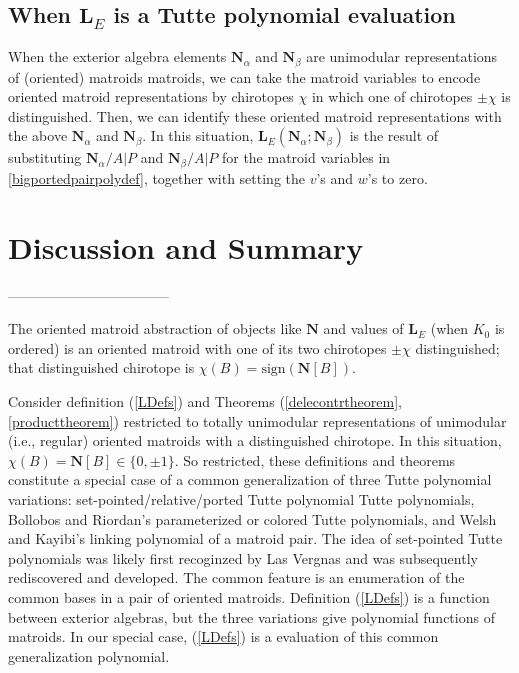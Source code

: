 \documentclass[Unicode]{cedram-alco}
\newcommand{\ext}[1]{\ensuremath{\mathbf{#1}}}
\begin{document}
\subsection{When $\ext{L}_E$ is a Tutte polynomial evaluation}
When the exterior algebra elements $\ext{N}_\alpha$ and $\ext{N}_\beta$ are
unimodular representations of (oriented) matroids matroids,  we can take the
matroid variables to encode oriented matroid representations by chirotopes $\chi$
in which one of chirotopes $\pm \chi$ is distinguished.  Then, we can identify
these oriented matroid representations with the above  $\ext{N}_\alpha$ and $\ext{N}_\beta$.
In this situation, $\ext{L}_E(\ext{N}_\alpha;\ext{N}_\beta)$ is the result
of substituting $\ext{N}_\alpha/A|P$ and $\ext{N}_\beta/A|P$ for the matroid
variables in \ref{bigportedpairpolydef}, together with setting the $v$'s and $w$'s to zero.

\section{Discussion and Summary}\label{discussion}



\newpage

-----------------------------------

The oriented matroid abstraction of objects like $\ext{N}$ and values of $\ext{L}_E$
(when $K_0$ is ordered) is an oriented matroid with one of its two chirotopes $\pm \chi$ distinguished; that
distinguished chirotope is $\chi(B) = \text{sign}(\ext{N}[B])$.

Consider definition (\ref{LDefs}) and Theorems (\ref{delecontrtheorem},\ref{producttheorem})
restricted to totally unimodular representations of unimodular (i.e., regular) oriented matroids
with a distinguished chirotope.  In this situation,  $\chi(B) = \ext{N}[B]\in \{0,\pm 1\}$.
So restricted, these definitions and theorems constitute a special case
of a common generalization of three Tutte polynomial variations:
set-pointed/relative/ported Tutte polynomial
Tutte polynomials, 
Bollobos and Riordan's parameterized or colored Tutte polynomials\cite{BollobasRiordanTuttePolyColored},
and Welsh and Kayibi's linking
polynomial of a matroid pair\cite{WelshKayibiLinking}. The idea of set-pointed Tutte polynomials
was likely first recoginzed by Las Vergnas\cite{MR0419272}
and was subsequently rediscovered and developed\cite{sdcPorted,SetPointedLV,RelTuttePolyDiaoHetyei}.
The common feature is an enumeration
of the common bases in a pair of oriented matroids.  Definition (\ref{LDefs}) is a function between
exterior algebras, but the three variations give polynomial functions of matroids.  In our special
case, (\ref{LDefs}) is a evaluation of this common generalization polynomial. 
\end{document}
